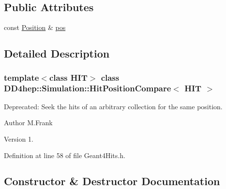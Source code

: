\subsection*{Public Attributes}
\begin{DoxyCompactItemize}
\item 
const \hyperlink{namespace_d_d4hep_1_1_geometry_a55083902099d03506c6db01b80404900}{Position} \& \hyperlink{struct_d_d4hep_1_1_simulation_1_1_hit_position_compare_a7518eb9e68d39b52d5974d90ddaad47d}{pos}
\end{DoxyCompactItemize}


\subsection{Detailed Description}
\subsubsection*{template$<$class H\+IT$>$\newline
class D\+D4hep\+::\+Simulation\+::\+Hit\+Position\+Compare$<$ H\+I\+T $>$}

Deprecated\+: Seek the hits of an arbitrary collection for the same position. 

\begin{DoxyAuthor}{Author}
M.\+Frank 
\end{DoxyAuthor}
\begin{DoxyVersion}{Version}
1. 
\end{DoxyVersion}


Definition at line 58 of file Geant4\+Hits.\+h.



\subsection{Constructor \& Destructor Documentation}
\hypertarget{struct_d_d4hep_1_1_simulation_1_1_hit_position_compare_aa1d22cc065ef2af450b0d30188f1a1a7}{}\label{struct_d_d4hep_1_1_simulation_1_1_hit_position_compare_aa1d22cc065ef2af450b0d30188f1a1a7} 
